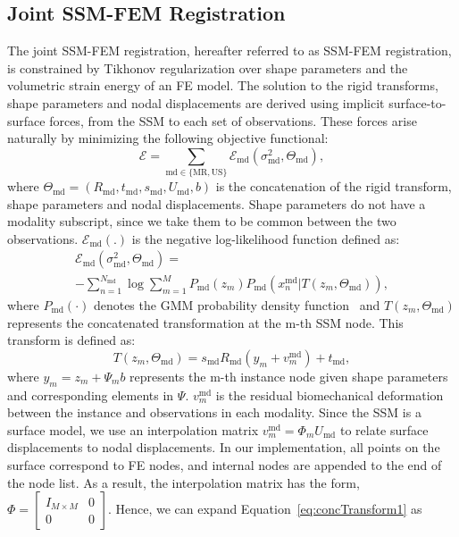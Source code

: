 \documentclass[journal]{IEEEtran}
\begin{document}
\subsection{Joint SSM-FEM Registration}
The joint SSM-FEM registration, hereafter referred to as SSM-FEM registration, is constrained by Tikhonov regularization over shape parameters and the volumetric strain energy of an FE model. The solution to the rigid transforms, shape parameters and nodal displacements are derived using implicit surface-to-surface forces, from the SSM to each set of observations. These forces arise naturally by minimizing the following objective functional:
\begin{equation} \label{eq:objTotal1}
\mathcal{E} = \sum_{\mathrm{md}\in\{\mathrm{MR},\mathrm{US}\}}\mathcal{E}_\mathrm{md}(\sigma^2_\mathrm{md},\Theta_\mathrm{md}),
\end{equation}
where $\Theta_\mathrm{md}=(R_\mathrm{md},t_\mathrm{md},s_\mathrm{md},U_\mathrm{md},b)$ is the concatenation of the rigid transform, shape parameters and nodal displacements. Shape parameters do not have a modality subscript, since we take them to be common between the two observations. $\mathcal{E}_\mathrm{md}(.)$ is the negative log-likelihood function defined as:
\begin{multline} \label{eq:objMod1}
\mathcal{E}_\mathrm{md}(\sigma^2_\mathrm{md},\Theta_\mathrm{md}) = \\ -\sum_{n=1}^{N_\mathrm{md}}\log\sum_{m=1}^MP_\mathrm{md}(z_m)P_\mathrm{md}(x^\mathrm{md}_n|T(z_m,\Theta_\mathrm{md})),
\end{multline}
where $P_\mathrm{md}(\cdot)$ denotes the GMM probability density function~\cite{Myronenko10a} and $T(z_m,\Theta_\mathrm{md})$ represents the concatenated transformation at the m-th SSM node. This transform is defined as:
\begin{equation} \label{eq:concTransform1}
T(z_m,\Theta_\mathrm{md}) = s_\mathrm{md}R_\mathrm{md}(y_m+v^\mathrm{md}_m) + t_\mathrm{md},
\end{equation}
where $y_m=z_m+\Psi_mb$ represents the m-th instance node given shape parameters and corresponding elements in $\Psi$. $v^\mathrm{md}_m$ is the residual biomechanical deformation between the instance and observations in each modality. Since the SSM is a surface model, we use an interpolation matrix $v^\mathrm{md}_m=\Phi_mU_\mathrm{md}$ to relate surface displacements to nodal displacements. In our implementation, all points on the surface correspond to FE nodes, and internal nodes are appended to the end of the node list. As a result, the interpolation matrix has the form, $\Phi=\begin{bmatrix} I_{M\times M} & 0\\ 0 & 0 \end{bmatrix}$. Hence, we can expand Equation~\ref{eq:concTransform1} as
\end{document}
